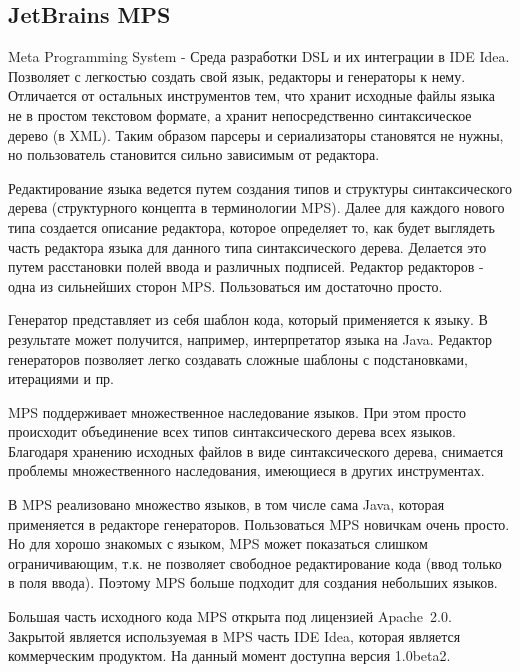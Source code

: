 \documentclass[a4paper,12pt]{article}
\begin{document}
\subsection{JetBrains MPS}
Meta Programming System - Среда разработки DSL и их интеграции в IDE Idea.
Позволяет с легкостью создать свой язык, редакторы и генераторы к нему.
Отличается от остальных инструментов тем, что хранит исходные файлы языка не в
простом текстовом формате, а хранит непосредственно синтаксическое дерево (в
XML). Таким образом парсеры и сериализаторы становятся не нужны, но
пользователь становится сильно зависимым от редактора.

Редактирование языка ведется путем создания типов и структуры синтаксического
дерева (структурного концепта в терминологии MPS). Далее для каждого нового типа
создается описание редактора, которое определяет то, как будет выглядеть часть
редактора языка для данного типа синтаксического дерева. Делается это путем
расстановки полей ввода и различных подписей. Редактор редакторов - одна из
сильнейших сторон MPS. Пользоваться им достаточно просто.

Генератор представляет из себя шаблон кода, который применяется к языку. В
результате может получится, например, интерпретатор языка на Java. Редактор
генераторов позволяет легко создавать сложные шаблоны с подстановками,
итерациями и пр.

MPS поддерживает множественное наследование языков. При этом просто происходит 
объединение всех типов синтаксического дерева всех языков. Благодаря хранению
исходных файлов в виде синтаксического дерева, снимается проблемы
множественного наследования, имеющиеся в других инструментах.

В MPS реализовано множество языков, в том числе сама Java, которая применяется
в редакторе генераторов. Пользоваться MPS новичкам очень просто. Но для хорошо
знакомых с языком, MPS может показаться слишком ограничивающим, т.к. не позволяет
свободное редактирование кода (ввод только в поля ввода). Поэтому MPS больше
подходит для создания небольших языков.

Большая часть исходного кода MPS открыта под лицензией Apache~2.0. Закрытой
является используемая в MPS часть IDE Idea, которая является коммерческим
продуктом.
На данный момент доступна версия 1.0beta2.
\end{document}
